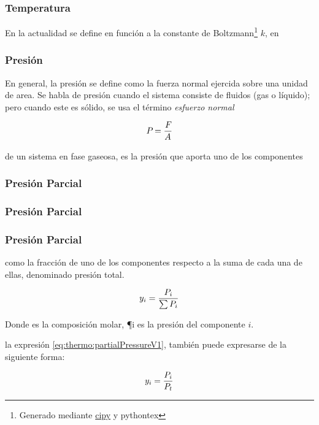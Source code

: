 \subsubsection{Temperatura}
En la actualidad se define en función a la constante de Boltzmann\footnote{Generado mediante \href{https://docs.scipy.org/doc/scipy/reference/constants.html}{cipy} y pythontex} {$k$},  en
\subsubsection{Presión}
En general, la presión se define como la fuerza normal ejercida sobre una unidad de area. Se habla de presión cuando el sistema consiste de fluidos (gas o líquido); pero cuando este es sólido, se usa el término \textit{esfuerzo normal} \textcite{YunusA.Cengel2015}

\begin{equation}
  P_{} = \frac{{F}_{}}{{A}_{}}
\end{equation}

\figMolecularColissions

de un sistema en fase gaseosa, es la presión que aporta uno de los componentes


\subsubsection{Presión Parcial}
\subsubsection{Presión Parcial}

\subsubsection{Presión Parcial}
como la fracción de uno de los componentes respecto a la suma de cada una de ellas, denominado presión total.

\begin{equation}
  \label{eq:thermo:partialPressureV1}
  {y_{i}} = \frac{P_{i}}{\sum{\ensuremath{P_{i}}}}
\end{equation}

Donde  es la composición molar, {\P{i}} es la presión del componente {${i}$}.

la expresión \eqref{eq:thermo:partialPressureV1}, también puede expresarse de la siguiente forma:

\begin{equation}
  \label{eq:thermo:partialPressureV2}
  {y_{i}} = \frac{P_{i}}{P_{t}}
\end{equation}

